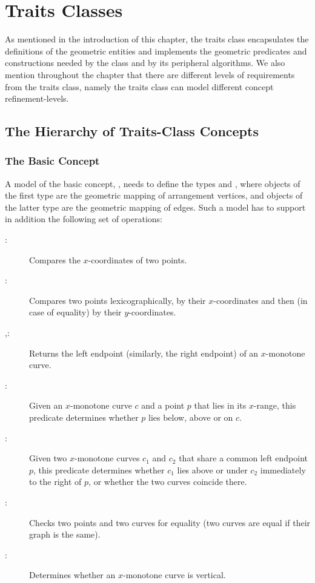 \section{Traits Classes\label{arr_sec:traits}}

As mentioned in the introduction of this chapter, the traits class
encapsulates the definitions of the geometric entities and
implements the geometric predicates and constructions needed by
the  class and by its peripheral algorithms. We also
mention throughout the chapter that there are different levels of
requirements from the traits class, namely the traits class can model
different concept refinement-levels.

\subsection{The Hierarchy of Traits-Class Concepts
\label{arr_sssec:tr_concepts}}

\subsubsection{The Basic Concept
\label{arr_sssec:tr_basic_concept}}

A model of the basic concept, ,
needs to define the types  and
, where objects of the first type are
the geometric mapping of arrangement vertices, and objects of the
latter type are the geometric mapping of edges. Such a model has to
support in addition the following set of operations: 
\begin{description}
\item[:] Compares the $x$-coordinates of two points.
\item[:] Compares two points lexicographically, by
  their $x$-coordinates and then (in case of equality) by their
  $y$-coordinates.
\item[,:]
  Returns the left endpoint (similarly, the right endpoint) of
  an $x$-monotone curve.
\item[:] Given an $x$-monotone curve $c$ and a
  point $p$ that lies in its $x$-range, this predicate determines
  whether $p$ lies below, above or on $c$.
\item[:]
  Given two $x$-monotone curves $c_1$ and $c_2$ that share a common
  left endpoint $p$, this predicate determines whether $c_1$ lies
  above or under $c_2$ immediately to the right of $p$, or whether the
  two curves coincide there.
\item[:] Checks two points and two curves for equality
  (two curves are equal if their graph is the same).
\item[:]
  Determines whether an $x$-monotone curve is vertical.
\end{description}

